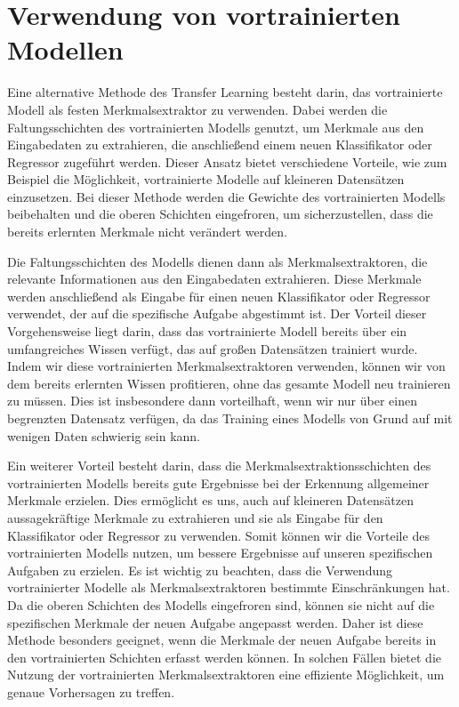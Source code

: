 \section{Verwendung von vortrainierten Modellen} %

    Eine alternative Methode des Transfer Learning besteht darin, das vortrainierte Modell als festen Merkmalsextraktor zu verwenden. 
    Dabei werden die Faltungsschichten des vortrainierten Modells genutzt, um Merkmale aus den Eingabedaten zu extrahieren, die anschließend einem neuen Klassifikator oder Regressor zugeführt werden. 
    Dieser Ansatz bietet verschiedene Vorteile, wie zum Beispiel die Möglichkeit, vortrainierte Modelle auf kleineren Datensätzen einzusetzen.
    Bei dieser Methode werden die Gewichte des vortrainierten Modells beibehalten und die oberen Schichten eingefroren, um sicherzustellen, dass die bereits erlernten Merkmale nicht verändert werden. 
    
    Die Faltungsschichten des Modells dienen dann als Merkmalsextraktoren, die relevante Informationen aus den Eingabedaten extrahieren. 
    Diese Merkmale werden anschließend als Eingabe für einen neuen Klassifikator oder Regressor verwendet, der auf die spezifische Aufgabe abgestimmt ist.
    Der Vorteil dieser Vorgehensweise liegt darin, dass das vortrainierte Modell bereits über ein umfangreiches Wissen verfügt, das auf großen Datensätzen trainiert wurde. 
    Indem wir diese vortrainierten Merkmalsextraktoren verwenden, können wir von dem bereits erlernten Wissen profitieren, ohne das gesamte Modell neu trainieren zu müssen. 
    Dies ist insbesondere dann vorteilhaft, wenn wir nur über einen begrenzten Datensatz verfügen, da das Training eines Modells von Grund auf mit wenigen Daten schwierig sein kann.
    
    Ein weiterer Vorteil besteht darin, dass die Merkmalsextraktionsschichten des vortrainierten Modells bereits gute Ergebnisse bei der Erkennung allgemeiner Merkmale erzielen. 
    Dies ermöglicht es uns, auch auf kleineren Datensätzen aussagekräftige Merkmale zu extrahieren und sie als Eingabe für den Klassifikator oder Regressor zu verwenden. 
    Somit können wir die Vorteile des vortrainierten Modells nutzen, um bessere Ergebnisse auf unseren spezifischen Aufgaben zu erzielen.
    Es ist wichtig zu beachten, dass die Verwendung vortrainierter Modelle als Merkmalsextraktoren bestimmte Einschränkungen hat. 
    Da die oberen Schichten des Modells eingefroren sind, können sie nicht auf die spezifischen Merkmale der neuen Aufgabe angepasst werden. 
    Daher ist diese Methode besonders geeignet, wenn die Merkmale der neuen Aufgabe bereits in den vortrainierten Schichten erfasst werden können. 
    In solchen Fällen bietet die Nutzung der vortrainierten Merkmalsextraktoren eine effiziente Möglichkeit, um genaue Vorhersagen zu treffen.

